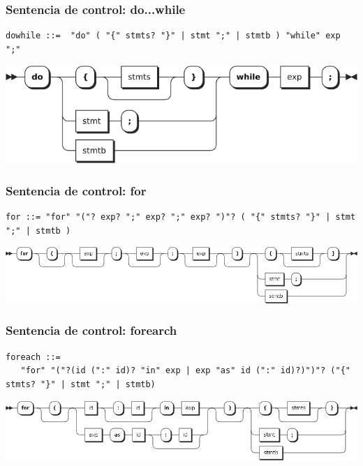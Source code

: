 \subsubsection{Sentencia de control: do...while}
\begin{lstlisting}[style=nonumbers]
dowhile ::=  "do" ( "{" stmts? "}" | stmt ";" | stmtb ) "while" exp ";"
\end{lstlisting}  	
\begin{center}
\includegraphics[scale=0.5]{diagram/dowhile.png} \\
\end{center}

\subsubsection{Sentencia de control: for}
\begin{lstlisting}[style=nonumbers]
for ::= "for" "("? exp? ";" exp? ";" exp? ")"? ( "{" stmts? "}" | stmt ";" | stmtb )
\end{lstlisting}  	
\begin{center}
\includegraphics[scale=0.4]{diagram/for.png} \\
\end{center}
\subsubsection{Sentencia de control: forearch}
\begin{lstlisting}[style=nonumbers,basicstyle=\tiny]
foreach ::= 
   "for" "("?(id (":" id)? "in" exp | exp "as" id (":" id)?)")"? ("{" stmts? "}" | stmt ";" | stmtb)
\end{lstlisting}  	
\begin{center}
\includegraphics[scale=0.4]{diagram/foreach.png} \\
\end{center}
\pagebreak
